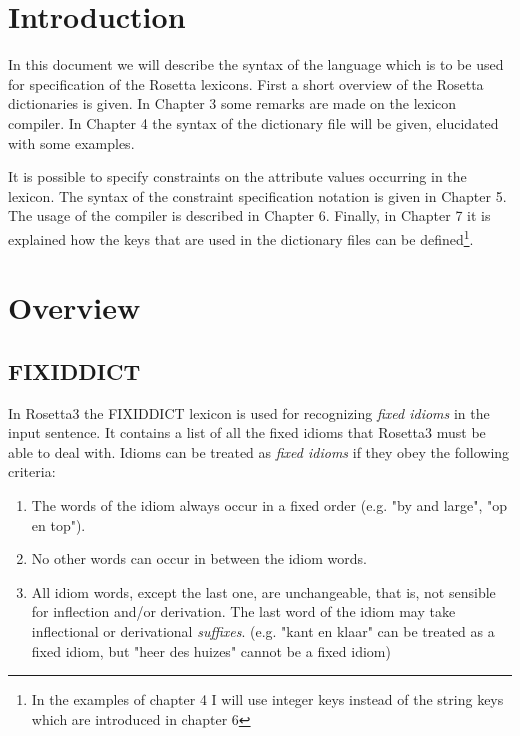
   \MakeRosTitle
\section  {Introduction}
In this document we will describe the syntax of the language which is to be
used for specification of the Rosetta lexicons.
First a short overview of the Rosetta dictionaries
is given. In Chapter 3 some remarks are made on the lexicon compiler.
In Chapter 4 the syntax of the dictionary file will be 
given, elucidated with some examples. 

It is possible to specify constraints on 
the attribute values occurring in the lexicon. The syntax of the constraint
specification notation is given in Chapter 5.
The usage of the compiler is described
in Chapter 6. Finally, in Chapter 7 it is explained
how the keys that are used in the dictionary files can be defined\footnote{In 
the examples of chapter 4 I will use integer keys instead of the string keys 
which are introduced in chapter 6}.

\section {Overview}
\subsection {FIXIDDICT}
In Rosetta3 the FIXIDDICT lexicon is used for recognizing {\em fixed idioms}
in the input sentence. It contains a list of all the fixed idioms that
Rosetta3 must be able to deal with. Idioms can be treated as {\em fixed
idioms} if they obey the following criteria: \\
\begin {enumerate}
  \item The words of the idiom always occur in a fixed order (e.g. "by and 
large", "op en top").
  \item No other words can occur in between the idiom words.
  \item All idiom words, except the last one, are unchangeable, that is, not
sensible for inflection and/or derivation. The last word of the idiom may
take inflectional or derivational {\em suffixes}. (e.g. "kant en klaar" can be
treated as a fixed idiom, but "heer des huizes" cannot be a fixed idiom)
\end {enumerate}


